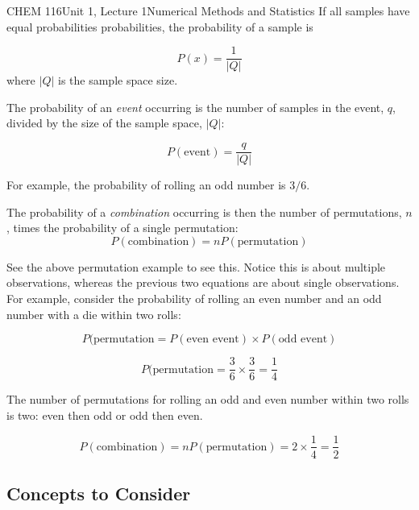 \documentclass{article}
\begin{document}
\begin{tdoc}{CHEM 116}{Unit 1, Lecture 1}{Numerical Methods and Statistics}
If all samples have equal probabilities probabilities, the probability of a
sample is

\begin{equation}
P(x) = \frac{1}{|Q|}
\end{equation}
where $|Q|$ is the sample space size.
\vspace{0.2cm}


The probability of an \emph{event} occurring is the number of samples
in the event, $q$, divided by the size of the sample space, $|Q|$:

\begin{equation}
P(\textrm{event}) = \frac{q}{|Q|}
\end{equation}

For example, the probability of rolling an odd number is $3 / 6$.


The probability of a \emph{combination} occurring is then the number of
permutations, $n$, times the probability of a single permutation:
\begin{equation}
P(\textrm{combination}) = n P(\textrm{permutation})
\end{equation}
\vspace{0.2cm}

See the above permutation example to see this. Notice this is about multiple observations, whereas the previous two equations are about single observations. For example, consider the probability of rolling an even number and an odd number with a die within two rolls:

\begin{equation}
P(\textrm{permutation} = P(\textrm{even event}) \times P(\textrm{odd event})
\end{equation}

\begin{equation}
P(\textrm{permutation} = \frac{3}{6} \times \frac{3}{6} = \frac{1}{4}
\end{equation}

The number of permutations for rolling an odd and even number within two rolls is two: even then odd or odd then even.

\begin{equation}
P(\textrm{combination}) = n P(\textrm{permutation}) = 2 \times \frac{1}{4} = \frac{1}{2}
\end{equation}

\subsection{Concepts to Consider}


\end{tdoc}
\end{document}
